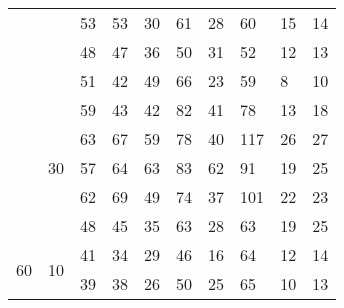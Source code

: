 \begin{table}[h]
\begin{tabular}{ll|l|l|l|l|l|l|l|l|}
\multicolumn{1}{|l|}{}                     &                                          & 53              & 53            & 30              & 61            & 28              & 60            & 15              & 14            \\ \cline{3-10} 
\multicolumn{1}{|l|}{}                     &                                          & 48              & 47            & 36              & 50            & 31              & 52            & 12              & 13            \\ \cline{3-10} 
\multicolumn{1}{|l|}{}                     &                                          & 51              & 42            & 49              & 66            & 23              & 59            & 8               & 10            \\ \cline{2-10} 
\multicolumn{1}{|l|}{}                     & \multirow{5}{*}{30}                      & 59              & 43            & 42              & 82            & 41              & 78            & 13              & 18            \\ \cline{3-10} 
\multicolumn{1}{|l|}{}                     &                                          & 63              & 67            & 59              & 78            & 40              & 117           & 26              & 27            \\ \cline{3-10} 
\multicolumn{1}{|l|}{}                     &                                          & 57              & 64            & 63              & 83            & 62              & 91            & 19              & 25            \\ \cline{3-10} 
\multicolumn{1}{|l|}{}                     &                                          & 62              & 69            & 49              & 74            & 37              & 101           & 22              & 23            \\ \cline{3-10} 
\multicolumn{1}{|l|}{}                     &                                          & 48              & 45            & 35              & 63            & 28              & 63            & 19              & 25            \\ \hline
\multicolumn{1}{|l|}{\multirow{15}{*}{60}} & \multirow{5}{*}{10}                      & 41              & 34            & 29              & 46            & 16              & 64            & 12              & 14            \\ \cline{3-10} 
\multicolumn{1}{|l|}{}                     &                                          & 39              & 38            & 26              & 50            & 25              & 65            & 10              & 13            \\ \cline{3-10} 

\end{tabular}
\end{table}
